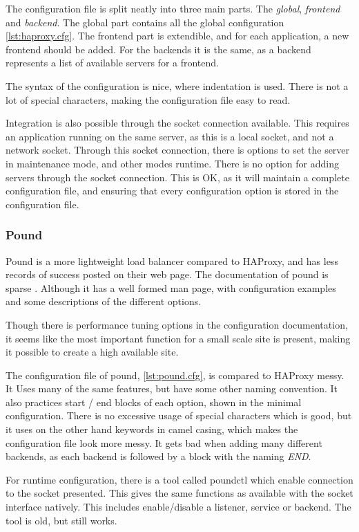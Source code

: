 The configuration file is split neatly into three main parts. The
\textit{global}, \textit{frontend} and \textit{backend}. The global part
contains all the global configuration \vref{lst:haproxy.cfg}. The frontend part
is extendible, and for each application, a new frontend should be added. For
the backends it is the same, as a backend represents a list of available servers
for a frontend.

The syntax of the configuration is nice, where indentation is used. There is
not a lot of special characters, making the configuration file easy to read.

Integration is also possible through the socket connection available. This
requires an application running on the same server, as this is a local socket,
and not a network socket. Through this socket connection, there is options to
set the server in maintenance mode, and other modes runtime. There is no option
for adding servers through the socket connection. This is OK, as it will
maintain a complete configuration file, and ensuring that every configuration
option is stored in the configuration file.

\subsubsection{Pound}
Pound is a more lightweight load balancer compared to HAProxy, and has less
records of success posted on their web page.
The documentation of pound is sparse \cite{pound}. Although it has a well
formed man page, with configuration examples and some descriptions of the
different options.

Though there is performance tuning options in the configuration documentation,
it seems like the most important function for a small scale site is present,
making it possible to create a high available site.

The configuration file of pound, \vref{lst:pound.cfg}, is compared to HAProxy
messy. It Uses many of the same features, but have some other naming
convention. It also practices start / end blocks of each option, shown in the
minimal configuration. There is no excessive usage of special characters which
is good, but it uses on the other hand keywords in camel casing, which makes
the configuration file look more messy. It gets bad when adding many different
backends, as each backend is followed by a block with the naming \textit{END}.

For runtime configuration, there is a tool called poundctl which enable
connection to the socket presented. This gives the same functions as available
with the socket interface natively. This includes enable/disable a listener,
service or backend. The tool is old, but still works.

